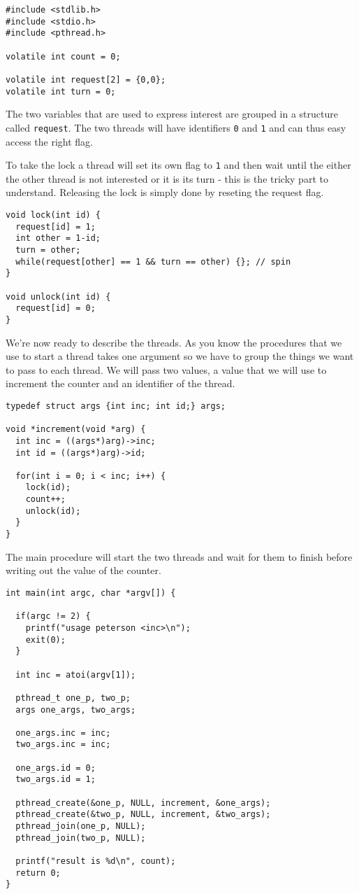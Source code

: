 \documentclass[a4paper,11pt]{article}
\begin{document}
\begin{lstlisting}
#include <stdlib.h>
#include <stdio.h>
#include <pthread.h>

volatile int count = 0;

volatile int request[2] = {0,0};
volatile int turn = 0;
\end{lstlisting}

The two variables that are used to express interest are grouped in a
structure called {\tt request}. The two threads will have identifiers
{\tt 0} and {\tt 1} and can thus easy access the right flag. 

To take the lock a thread will set its own flag to {\tt 1} and then
wait until the either the other thread is not interested or it is its
turn - this is the tricky part to understand. Releasing the lock is
simply done by reseting the request flag.

\begin{lstlisting}
void lock(int id) {
  request[id] = 1;
  int other = 1-id;
  turn = other;
  while(request[other] == 1 && turn == other) {}; // spin
}

void unlock(int id) {
  request[id] = 0;
}
\end{lstlisting}

We're now ready to describe the threads. As you know the procedures
that we use to start a thread takes one argument so we have to group
the things we want to pass to each thread. We will pass two values, a
value that we will use to increment the counter and an identifier of
the thread.

\begin{lstlisting}
typedef struct args {int inc; int id;} args;

void *increment(void *arg) {
  int inc = ((args*)arg)->inc;
  int id = ((args*)arg)->id;
  
  for(int i = 0; i < inc; i++) {
    lock(id);
    count++;
    unlock(id);
  }
}
\end{lstlisting}

The main procedure will start the two threads and wait for them to
finish before writing out the value of the counter.

\begin{lstlisting}
int main(int argc, char *argv[]) {

  if(argc != 2) {
    printf("usage peterson <inc>\n");
    exit(0);
  }

  int inc = atoi(argv[1]);
  
  pthread_t one_p, two_p;
  args one_args, two_args;

  one_args.inc = inc;
  two_args.inc = inc;

  one_args.id = 0;
  two_args.id = 1;

  pthread_create(&one_p, NULL, increment, &one_args);
  pthread_create(&two_p, NULL, increment, &two_args);
  pthread_join(one_p, NULL);
  pthread_join(two_p, NULL);

  printf("result is %d\n", count);
  return 0;
}
\end{lstlisting}
\end{document}
